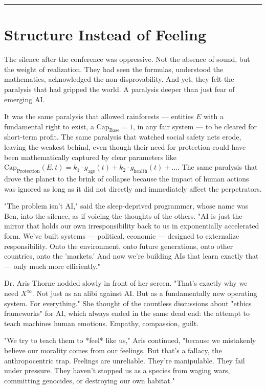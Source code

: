 \documentclass[12pt, english, parskip=full]{scrartcl} %
\begin{document}
\noindent\rule{\linewidth}{0.4pt}

\section{Structure Instead of Feeling}
The silence after the conference was oppressive. Not the absence of sound, but the weight of realization. They had seen the formulas, understood the mathematics, acknowledged the non-disprovability. And yet, they felt the paralysis that had gripped the world. A paralysis deeper than just fear of emerging AI.

It was the same paralysis that allowed rainforests — entities $E$ with a fundamental right to exist, a $\text{Cap}_{\text{Base}} = 1$, in any fair system — to be cleared for short-term profit. The same paralysis that watched social safety nets erode, leaving the weakest behind, even though their need for protection could have been mathematically captured by clear parameters like $\text{Cap}_{\text{Protection}}(E, t) = k_1 \cdot g_{\text{age}}(t) + k_2 \cdot g_{\text{health}}(t) + \dots$. The same paralysis that drove the planet to the brink of collapse because the impact of human actions was ignored as long as it did not directly and immediately affect the perpetrators.

"The problem isn’t AI," said the sleep-deprived programmer, whose name was Ben, into the silence, as if voicing the thoughts of the others. "AI is just the mirror that holds our own irresponsibility back to us in exponentially accelerated form. We’ve built systems — political, economic — designed to externalize responsibility. Onto the environment, onto future generations, onto other countries, onto the 'markets.' And now we’re building AIs that learn exactly that — only much more efficiently."

Dr. Aris Thorne nodded slowly in front of her screen. "That’s exactly why we need $X^{\infty}$. Not just as an alibi against AI. But as a fundamentally new operating system. For everything." She thought of the countless discussions about "ethics frameworks" for AI, which always ended in the same dead end: the attempt to teach machines human emotions. Empathy, compassion, guilt.

"We try to teach them to *feel* like us," Aris continued, "because we mistakenly believe our morality comes from our feelings. But that’s a fallacy, the anthropocentric trap. Feelings are unreliable. They’re manipulable. They fail under pressure. They haven’t stopped us as a species from waging wars, committing genocides, or destroying our own habitat."
\end{document}
